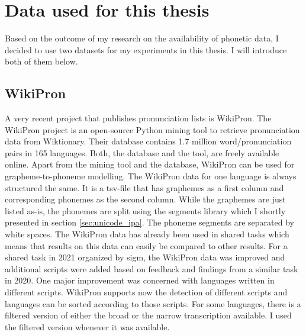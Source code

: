 \section{Data used for this thesis}
\label{sec:dataset}
Based on the outcome of my research on the availability of phonetic data, I decided to use two datasets for my experiments in this thesis. I will introduce both of them below. 

\subsection{WikiPron}
\label{sec:wikipron}
A very recent project that publishes pronunciation lists is WikiPron. The WikiPron project \citep{Lee&Ashby.2020} is an open-source Python mining tool to retrieve pronunciation data from Wiktionary. Their database contains 1.7 million word/pronunciation pairs in 165 languages. Both, the database and the tool, are freely available online. Apart from the mining tool and the database, WikiPron can be used for grapheme-to-phoneme modelling. The WikiPron data for one language is always structured the same. It is a tsv-file that has graphemes as a first column and corresponding phonemes as the second column. While the graphemes are just listed as-is, the phonemes are split using the segments library which I shortly presented in section \ref{sec:unicode_ipa}. The phoneme segments are separated by white spaces. 
The WikiPron data has already been used in shared tasks which means that results on this data can easily be compared to other results. For a shared task in 2021 organized by \ac{sigm}, the WikiPron data was improved and additional scripts were added based on feedback and findings from a similar task in 2020. One major improvement was concerned with languages written in different scripts. WikiPron supports now the detection of different scripts and languages can be sorted according to those scripts. For some languages, there is a filtered version of either the broad or the narrow transcription available. I used the filtered version whenever it was available.


